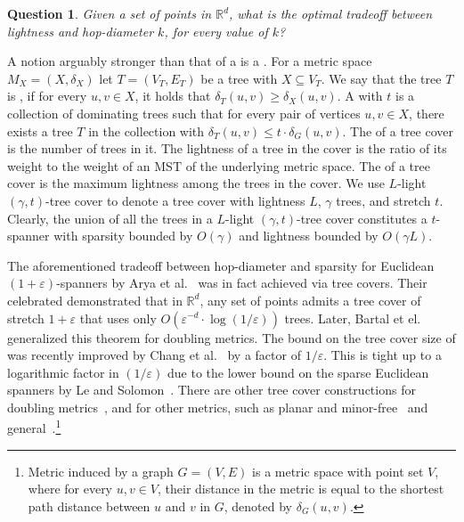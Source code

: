 \documentclass[11pt,english]{article}
\renewcommand{\emph}[1]{{\color{MyGreen}{\em #1}}}
\newcommand{\eps}{\varepsilon}
\newtheorem{question}{Question}
\begin{document}
\begin{question}\label{q:tradeoff}
Given a set of points in $\mathbb{R}^d$, what is the optimal tradeoff between lightness and hop-diameter $k$, for every value of $k$?
\end{question}


A notion arguably stronger than that of a \emph{spanner} is a \emph{tree cover}. For a metric space $M_X = (X, \delta_X)$ let $T = (V_T, E_T)$ be a tree with $X \subseteq V_T$. We say that the tree $T$ is \emph{dominating}, if for every $u, v \in X$, it holds that $\delta_T(u,v) \ge \delta_X(u,v)$.
A \emph{tree cover} with \emph{stretch} $t$ is a collection of dominating trees such that for every pair of vertices $u,v \in X$, there exists a tree $T$ in the collection with $\delta_T(u,v) \le t \cdot \delta_G(u,v)$. The \emph{size} of a tree cover is the number of trees in it. The lightness of a tree in the cover is the ratio of its weight to the weight of an MST of the underlying metric space.
The \emph{lightness} of a tree cover is the maximum lightness among the trees in the cover. We use $L$-light $(\gamma, t)$-tree cover to denote a tree cover with lightness $L$, $\gamma$ trees, and stretch $t$. 
Clearly, the union of all the trees in a $L$-light $(\gamma,t)$-tree cover constitutes a $t$-spanner with sparsity bounded by $O(\gamma)$ and lightness bounded by $O(\gamma L)$.

The aforementioned tradeoff between hop-diameter and sparsity for Euclidean $(1+\eps)$-spanners by Arya et al.~\cite{arya1995euclidean} was in fact achieved via tree covers.
Their celebrated \emph{``Dumbbell Theorem''} demonstrated that in $\mathbb{R}^d$, any set of points admits a tree cover of stretch $1+\eps$ that uses only $O(\eps^{-d}\cdot \log(1/\eps))$ trees. Later, Bartal et el.~\cite{bartal2022covering}
generalized this theorem for doubling metrics. 
The bound on the tree cover size of \cite{arya1995euclidean} was recently improved by Chang et al.~\cite{ChangC0MST24} by a factor of $1/\eps$. This is tight up to a logarithmic factor in $(1/\eps)$ due to the lower bound on the sparse Euclidean spanners by Le and Solomon~\cite{le2019truly}. There are other tree cover constructions for doubling metrics~\cite{chan2016hierarchical,bartal2022covering}, and for other metrics, such as planar and minor-free~\cite{bartal2022covering,chang2023covering,CCLMST24,gupta2005traveling,KLMN04} and general~\cite{bartal2022covering,mendel2007ramsey,naor2012scale}.\footnote{Metric induced by a graph $G=(V,E)$ is a metric space with point set $V$, where for every $u,v \in V$, their distance in the metric is equal to the shortest path distance between $u$ and $v$ in $G$, denoted by $\delta_G(u,v)$.}
\end{document}
